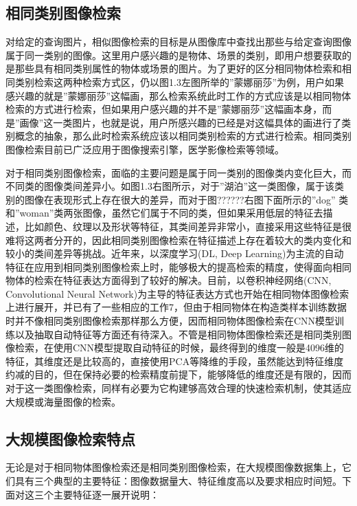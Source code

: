 \documentclass[color=cyan,mathpazo,titlestyle=hang]{elegantbook}
\begin{document}
\subsection{相同类别图像检索}

对给定的查询图片，相似图像检索的目标是从图像库中查找出那些与给定查询图像属于同一类别的图像。这里用户感兴趣的是物体、场景的类别，即用户想要获取的是那些具有相同类别属性的物体或场景的图片。为了更好的区分相同物体检索和相同类别检索这两种检索方式区，仍以图1.3左图所举的”蒙娜丽莎”为例，用户如果感兴趣的就是”蒙娜丽莎”这幅画，那么检索系统此时工作的方式应该是以相同物体检索的方式进行检索，但如果用户感兴趣的并不是”蒙娜丽莎”这幅画本身，而是”画像”这一类图片，也就是说，用户所感兴趣的已经是对这幅具体的画进行了类别概念的抽象，那么此时检索系统应该以相同类别检索的方式进行检索。相同类别图像检索目前已广泛应用于图像搜索引擎，医学影像检索等领域。

对于相同类别图像检索，面临的主要问题是属于同一类别的图像类内变化巨大，而不同类的图像类间差异小。如图1.3右图所示，对于”湖泊”这一类图像，属于该类别的图像在表现形式上存在很大的差异，而对于图??????右图下面所示的”dog” 类和”woman”类两张图像，虽然它们属于不同的类，但如果采用低层的特征去描述，比如颜色、纹理以及形状等特征，其类间差异非常小，直接采用这些特征是很难将这两者分开的，因此相同类别图像检索在特征描述上存在着较大的类内变化和较小的类间差异等挑战。近年来，以深度学习(DL, Deep Learning)为主流的自动特征在应用到相同类别图像检索上时，能够极大的提高检索的精度，使得面向相同物体的检索在特征表达方面得到了较好的解决。目前，以卷积神经网络(CNN, Convolutional Neural Network)为主导的特征表达方式也开始在相同物体图像检索上进行展开，并已有了一些相应的工作7，但由于相同物体在构造类样本训练数据时并不像相同类别图像检索那样那么方便，因而相同物体图像检索在CNN模型训练以及抽取自动特征等方面还有待深入。不管是相同物体图像检索还是相同类别图像检索，在使用CNN模型提取自动特征的时候，最终得到的维度一般是4096维的特征，其维度还是比较高的，直接使用PCA等降维的手段，虽然能达到特征维度约减的目的，但在保持必要的检索精度前提下，能够降低的维度还是有限的，因而对于这一类图像检索，同样有必要为它构建够高效合理的快速检索机制，使其适应大规模或海量图像的检索。

\subsection{大规模图像检索特点}

无论是对于相同物体图像检索还是相同类别图像检索，在大规模图像数据集上，它们具有三个典型的主要特征：图像数据量大、特征维度高以及要求相应时间短。下面对这三个主要特征逐一展开说明：
\end{document}

